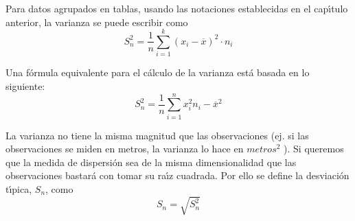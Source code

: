 Para datos agrupados en tablas, usando las notaciones establecidas en el
cap\'{\i}tulo anterior, la varianza se puede escribir como
\[
S_{n}^{2}=\frac{1}{n}\sum_{i=1}^{k}\left(  x_{i}-\overline{x}\right)
^{2}\cdot n_{i}%
\]

Una f\'{o}rmula equivalente para el c\'{a}lculo de la varianza est\'{a} basada
en lo siguiente:
\[
S_{n}^{2}=\frac{1}{n}\sum_{i=1}^{n}x_{i}^{2}n_{i}-\overline{x}^{2}%
\]

La varianza no tiene la misma magnitud que las observaciones (ej. si las
observaciones se miden en metros, la varianza lo hace en $metros^{2}$ ). Si
queremos que la medida de dispersi\'{o}n sea de la misma dimensionalidad que
las observaciones bastar\'{a} con tomar su ra\'{\i}z cuadrada. Por ello se
define la desviaci\'{o}n t\'{\i}pica, $S_{n}$, como
\[
S_{n}=\sqrt{S_{n}^{2}}%
\]
